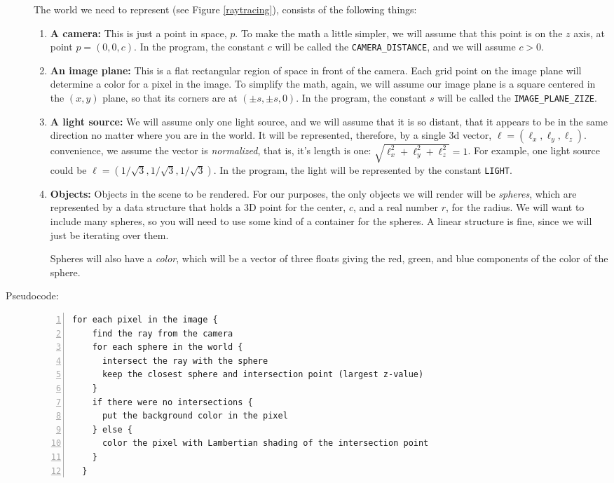 \documentclass{article}
\begin{document}
\begin{description}
The world we need to represent (see Figure \ref{raytracing}), consists
of the following things:
\begin{enumerate}
\item{\bf A camera:} This is just a point in space, $p$.  To make the math
  a little simpler, we will assume that this point is on the $z$ axis,
  at point $p=(0,0,c)$. In the program, the constant $c$ will be
  called the \verb|CAMERA_DISTANCE|, and we will assume $c > 0$.
\item{\bf An image plane:} This is a flat rectangular region of space in
  front of the camera.  Each grid point on the image plane will
  determine a color for a pixel in the image.  To simplify the math,
  again, we will assume our image plane is a square centered in the
  $(x,y)$ plane, so that its corners are at $(\pm s , \pm s, 0)$.  In
  the program, the constant $s$ will be called the
  \verb|IMAGE_PLANE_ZIZE|.
\item{\bf A light source:} We will assume only one light source, and we
  will assume that it is so distant, that it appears to be in the same
  direction no matter where you are in the world.  It will be
  represented, therefore, by a single 3d vector, $\ell =
  (\ell_x,\ell_y,\ell_z)$.  convenience, we assume the vector is {\em
    normalized}, that is, it's length is one: $\sqrt{\ell_x^2 +
    \ell_y^2 + \ell_z^2} = 1$.  For example, one light source could be
  $\ell = (1/\sqrt{3},1/\sqrt{3},1/\sqrt{3})$.  In the program, the
  light will be represented by the constant \verb|LIGHT|.
\item{\bf Objects:} Objects in the scene to be rendered.  For our
  purposes, the only objects we will render will be {\em spheres},
  which are represented by a data structure that holds a 3D point for
  the center, $c$, and a real number $r$, for the radius.  We will
  want to include many spheres, so you will need to use some kind of a
  container for the spheres.  A linear structure is fine, since we
  will just be iterating over them.

  Spheres will also have a {\em color}, which will be a vector of
  three floats giving the red, green, and blue components of the color
  of the sphere.
\end{enumerate}


\item[Pseudocode:]\mbox{}
  
\begin{Verbatim}[frame=single,numbers=left]
  for each pixel in the image {
    find the ray from the camera
    for each sphere in the world {
      intersect the ray with the sphere
      keep the closest sphere and intersection point (largest z-value)
    }
    if there were no intersections {
      put the background color in the pixel
    } else {
      color the pixel with Lambertian shading of the intersection point
    }
  }
\end{Verbatim}    


\end{description}
\end{document}
